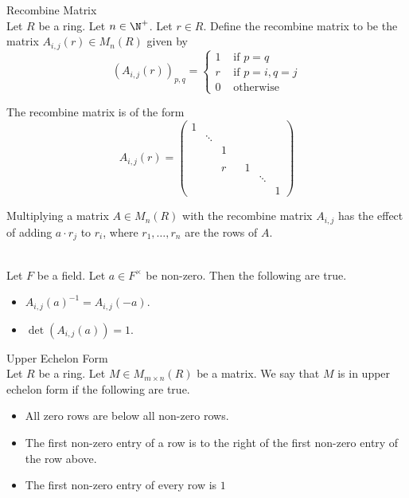 \documentclass[a4paper]{article}
\begin{document}
\begin{defn}{Recombine Matrix}{}\\
Let $R$ be a ring. Let $n\in\N^+$. Let $r\in R$. Define the recombine matrix to be the matrix $A_{i,j}(r)\in M_n(R)$ given by $$\left(A_{i,j}(r)\right)_{p,q}=\begin{cases}
1 & \text{ if }p=q\\
r & \text{ if }p=i,q=j\\
0 & \text{ otherwise }
\end{cases}$$
\end{defn}

The recombine matrix is of the form $$A_{i,j}(r)=
\begin{pmatrix}
1&&&&&&\\
&\ddots&&&&&\\
&&1&&&&\\
&&&&&&\\
&&r&&1&&\\
&&&&&\ddots&\\
&&&&&&1
\end{pmatrix}$$

Multiplying a matrix $A\in M_n(R)$ with the recombine matrix $A_{i,j}$ has the effect of adding $a\cdot r_j$ to $r_i$, where $r_1,\dots,r_n$ are the rows of $A$. 

\begin{lmm}{}{}\\
Let $F$ be a field. Let $a\in F^\times$ be non-zero. Then the following are true. 
\begin{itemize}
\item $A_{i,j}(a)^{-1}=A_{i,j}(-a)$. 
\item $\det(A_{i,j}(a))=1$. 
\end{itemize}
\end{lmm}

\begin{defn}{Upper Echelon Form}{}\\
Let $R$ be a ring. Let $M\in M_{m\times n}(R)$ be a matrix. We say that $M$ is in upper echelon form if the following are true. 
\begin{itemize}
\item All zero rows are below all non-zero rows. 
\item The first non-zero entry of a row is to the right of the first non-zero entry of the row above. 
\item The first non-zero entry of every row is $1$
\end{itemize}
\end{defn}
\end{document}
